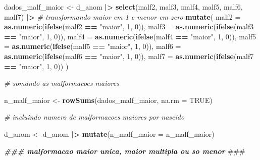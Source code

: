 \documentclass[
]{article}
\newenvironment{Shaded}{\begin{snugshade}}{\end{snugshade}}
\newcommand{\AlertTok}[1]{\textcolor[rgb]{0.94,0.16,0.16}{#1}}
\newcommand{\AttributeTok}[1]{\textcolor[rgb]{0.13,0.29,0.53}{#1}}
\newcommand{\CommentTok}[1]{\textcolor[rgb]{0.56,0.35,0.01}{\textit{#1}}}
\newcommand{\ConstantTok}[1]{\textcolor[rgb]{0.56,0.35,0.01}{#1}}
\newcommand{\DecValTok}[1]{\textcolor[rgb]{0.00,0.00,0.81}{#1}}
\newcommand{\DocumentationTok}[1]{\textcolor[rgb]{0.56,0.35,0.01}{\textbf{\textit{#1}}}}
\newcommand{\FunctionTok}[1]{\textcolor[rgb]{0.13,0.29,0.53}{\textbf{#1}}}
\newcommand{\NormalTok}[1]{#1}
\newcommand{\OtherTok}[1]{\textcolor[rgb]{0.56,0.35,0.01}{#1}}
\newcommand{\SpecialCharTok}[1]{\textcolor[rgb]{0.81,0.36,0.00}{\textbf{#1}}}
\newcommand{\StringTok}[1]{\textcolor[rgb]{0.31,0.60,0.02}{#1}}
\begin{document}
\begin{Shaded}
\begin{Highlighting}[]
\NormalTok{dados\_malf\_maior }\OtherTok{\textless{}{-}}\NormalTok{ d\_anom }\SpecialCharTok{|\textgreater{}} 
  \FunctionTok{select}\NormalTok{(malf2, malf3, malf4, malf5, malf6, malf7) }\SpecialCharTok{|\textgreater{}} 
  \CommentTok{\# transformando \textquotesingle{}maior\textquotesingle{} em 1 e \textquotesingle{}menor\textquotesingle{} em zero}
  \FunctionTok{mutate}\NormalTok{(}
    \AttributeTok{malf2 =} \FunctionTok{as.numeric}\NormalTok{(}\FunctionTok{ifelse}\NormalTok{(malf2 }\SpecialCharTok{==} \StringTok{"maior"}\NormalTok{, }\DecValTok{1}\NormalTok{, }\DecValTok{0}\NormalTok{)),}
    \AttributeTok{malf3 =} \FunctionTok{as.numeric}\NormalTok{(}\FunctionTok{ifelse}\NormalTok{(malf3 }\SpecialCharTok{==} \StringTok{"maior"}\NormalTok{, }\DecValTok{1}\NormalTok{, }\DecValTok{0}\NormalTok{)),}
    \AttributeTok{malf4 =} \FunctionTok{as.numeric}\NormalTok{(}\FunctionTok{ifelse}\NormalTok{(malf4 }\SpecialCharTok{==} \StringTok{"maior"}\NormalTok{, }\DecValTok{1}\NormalTok{, }\DecValTok{0}\NormalTok{)),}
    \AttributeTok{malf5 =} \FunctionTok{as.numeric}\NormalTok{(}\FunctionTok{ifelse}\NormalTok{(malf5 }\SpecialCharTok{==} \StringTok{"maior"}\NormalTok{, }\DecValTok{1}\NormalTok{, }\DecValTok{0}\NormalTok{)),}
    \AttributeTok{malf6 =} \FunctionTok{as.numeric}\NormalTok{(}\FunctionTok{ifelse}\NormalTok{(malf6 }\SpecialCharTok{==} \StringTok{"maior"}\NormalTok{, }\DecValTok{1}\NormalTok{, }\DecValTok{0}\NormalTok{)),}
    \AttributeTok{malf7 =} \FunctionTok{as.numeric}\NormalTok{(}\FunctionTok{ifelse}\NormalTok{(malf7 }\SpecialCharTok{==} \StringTok{"maior"}\NormalTok{, }\DecValTok{1}\NormalTok{, }\DecValTok{0}\NormalTok{))}
\NormalTok{  )}

\CommentTok{\# somando as malformacoes maiores}

\NormalTok{n\_malf\_maior }\OtherTok{\textless{}{-}} \FunctionTok{rowSums}\NormalTok{(dados\_malf\_maior, }\AttributeTok{na.rm =} \ConstantTok{TRUE}\NormalTok{)}

\CommentTok{\# incluindo numero de malformacoes maiores por nascido}

\NormalTok{d\_anom }\OtherTok{\textless{}{-}}\NormalTok{ d\_anom }\SpecialCharTok{|\textgreater{}} 
  \FunctionTok{mutate}\NormalTok{(}\AttributeTok{n\_malf\_maior =}\NormalTok{ n\_malf\_maior)}

\DocumentationTok{\#\#\# malformacao maior unica, maior multipla ou so menor }\AlertTok{\#\#\#}


\end{Highlighting}
\end{Shaded}
\end{document}
